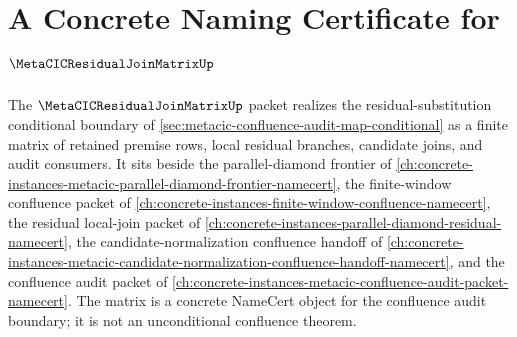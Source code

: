 \chapter{A Concrete Naming Certificate for $\MetaCICResidualJoinMatrixUp$}
\label{ch:concrete-instances-metacic-residual-join-matrix-namecert}

The $\MetaCICResidualJoinMatrixUp$ packet realizes the residual-substitution conditional boundary of \autoref{sec:metacic-confluence-audit-map-conditional} as a finite matrix of retained premise rows, local residual branches, candidate joins, and audit consumers. It sits beside the parallel-diamond frontier of \autoref{ch:concrete-instances-metacic-parallel-diamond-frontier-namecert}, the finite-window confluence packet of \autoref{ch:concrete-instances-finite-window-confluence-namecert}, the residual local-join packet of \autoref{ch:concrete-instances-parallel-diamond-residual-namecert}, the candidate-normalization confluence handoff of \autoref{ch:concrete-instances-metacic-candidate-normalization-confluence-handoff-namecert}, and the confluence audit packet of \autoref{ch:concrete-instances-metacic-confluence-audit-packet-namecert}. The matrix is a concrete NameCert object for the confluence audit boundary; it is not an unconditional confluence theorem.

